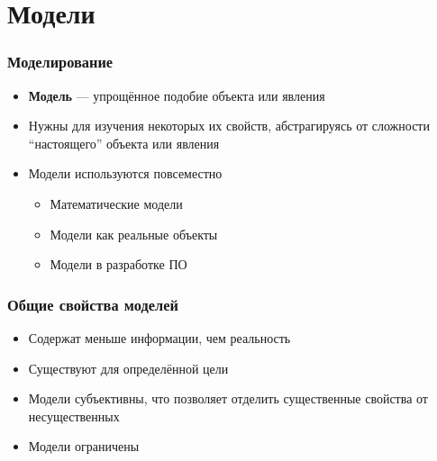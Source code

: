 \documentclass{../mcsslides}
\begin{document}
    \begin{frame}[plain]
        \titlepage
    \end{frame}

    \section{Модели}

    \begin{frame}
        \frametitle{Моделирование}
        \begin{itemize}
            \item \textbf{Модель} --- упрощённое подобие объекта или явления
            \item Нужны для изучения некоторых их свойств, абстрагируясь от сложности ``настоящего'' объекта или явления
            \item Модели используются повсеместно
            \begin{itemize}
                \item Математические модели
                \item Модели как реальные объекты
                \item Модели в разработке ПО
            \end{itemize}
        \end{itemize}
    \end{frame}

    \begin{frame}
        \frametitle{Общие свойства моделей}
        \begin{itemize}
            \item Содержат меньше информации, чем реальность
            \item Существуют для определённой цели
            \item Модели субъективны, что позволяет отделить существенные свойства от несущественных
            \item Модели ограничены
        \end{itemize}

    \end{frame}
\end{document}
